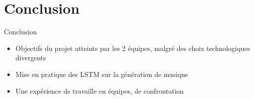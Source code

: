 \documentclass{beamer}
\begin{document}
\section{Conclusion}


\begin{frame}{Conclusion}
  \begin{itemize}
    \item Objectifs du projet atteints par les 2 équipes, malgré des choix technologiques divergents
    \item Mise en pratique des LSTM sur la génération de musique
    \item Une expérience de travaille en équipes, de confrontation
  \end{itemize}
\end{frame}
\end{document}
